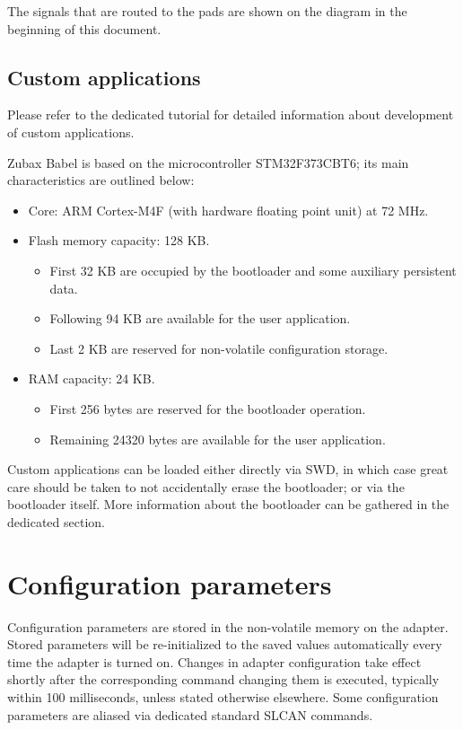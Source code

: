 \documentclass{zubaxdoc}
\begin{document}
The signals that are routed to the pads are shown on the diagram in the beginning of this document.

\section{Custom applications}

Please refer to the dedicated tutorial for detailed information about development of custom applications.

Zubax Babel is based on the microcontroller STM32F373CBT6; its main characteristics are outlined below:

\begin{itemize}
\item Core: ARM Cortex-M4F (with hardware floating point unit) at 72 MHz.
\item Flash memory capacity: 128 KB.
\begin{itemize}
\item First 32 KB are occupied by the bootloader and some auxiliary persistent data.
\item Following 94 KB are available for the user application.
\item Last 2 KB are reserved for non-volatile configuration storage.
\end{itemize}
\item RAM capacity: 24 KB.
\begin{itemize}
\item First 256 bytes are reserved for the bootloader operation.
\item Remaining 24320 bytes are available for the user application.
\end{itemize}
\end{itemize}

Custom applications can be loaded either directly via SWD, in which case great care should be taken to not accidentally erase the bootloader; or via the bootloader itself. More information about the bootloader can be gathered in the dedicated section.

\chapter{Configuration parameters}

Configuration parameters are stored in the non-volatile memory on the adapter. Stored parameters will be re-initialized to the saved values automatically every time the adapter is turned on. Changes in adapter configuration take effect shortly after the corresponding command changing them is executed, typically within 100 milliseconds, unless stated otherwise elsewhere. Some configuration parameters are aliased via dedicated standard SLCAN commands.
\end{document}
